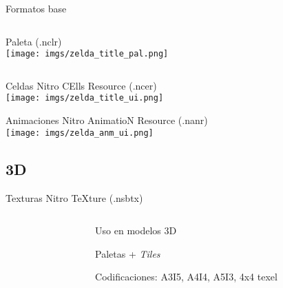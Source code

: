 \begin{frame}{Formatos base}
    \begin{columns}
    \begin{column}{0.45\textwidth}
        \centering{}Paleta (.nclr) \\ \vspace{5pt}
        \texttt{[image: imgs/zelda\_title\_pal.png]}
    \end{column}
    \begin{column}{0.05\textwidth}
    \end{column}
    \begin{column}{0.45\textwidth}
        \centering{} \\ \vspace{5pt}
    \end{column}
    \end{columns}
\end{frame}

\begin{frame}{Celdas}
    \centering{}Nitro CElls Resource (.ncer) \\ \vspace{5pt}
    \texttt{[image: imgs/zelda\_title\_ui.png]}
\end{frame}

\begin{frame}{Animaciones}
    \centering{}Nitro AnimatioN Resource (.nanr) \\ \vspace{5pt}
    \texttt{[image: imgs/zelda\_anm\_ui.png]}
\end{frame}

\subsection{3D}
\begin{frame}{Texturas}
    \centering{}Nitro TeXture (.nsbtx) \\ \vspace{5pt}
    \begin{columns}
    \begin{column}{0.5\textwidth}
    \end{column}
    \begin{column}{0.6\textwidth}
        \begin{wideitemize}
            \item<1-> Uso en modelos 3D
            \item<2-> Paletas + \textit{Tiles}
            \item<3-> Codificaciones: A3I5, A4I4, A5I3, 4x4 texel
        \end{wideitemize}
    \end{column}
    \end{columns}
\end{frame}

